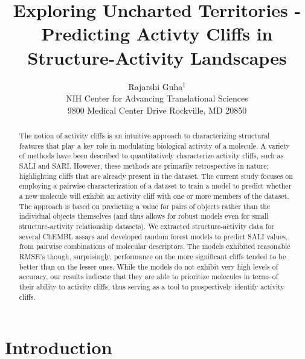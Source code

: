 \documentclass[letterpaper, 12pt]{article}
\begin{document}
\title{Exploring Uncharted Territories - Predicting Activty Cliffs in
  Structure-Activity Landscapes}
\author{Rajarshi Guha${}^{\ddagger}$\\
NIH Center for Advancing Translational Sciences \\ 9800 Medical Center Drive  Rockville, MD 20850}
\date{}

\maketitle
\begin{abstract}
  The notion of activity cliffs is an intuitive approach to characterizing structural features that
  play a key role in modulating biological activity of a molecule. A variety of methods have been
  described to quantitatively characterize activity cliffs, such as SALI and SARI. However, these
  methods are primarily retrospective in nature; highlighting cliffs that are already present in the
  dataset. The current study focuses on employing a pairwise characterization of a dataset to train
  a model to predict whether a new molecule will exhibit an activity cliff with one or more members
  of the dataset. The approach is based on predicting a value for pairs of objects rather than the
  individual objects themselves (and thus allows for robust models even for small structure-activity
  relationship datasets). We extracted structure-activity data for several ChEMBL assays and
  developed random forest models to predict SALI values, from pairwise combinations of molecular
  descriptors. The models exhibited reasonable RMSE's though, surprisingly, performance on the more
  significant cliffs tended to be better than on the lesser ones. While the models do not exhibit
  very high levels of accuracy, our results indicate that they are able to prioritize molecules in
  terms of their ability to activity cliffs, thus serving as a tool to prospectively identify
  activity cliffs.
\end{abstract}

\section{Introduction}
\end{document}
